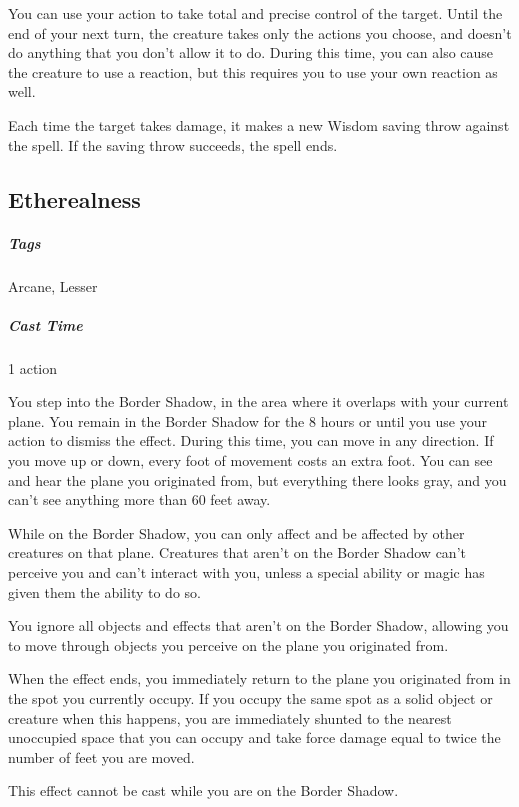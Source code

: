 You can use your action to take total and precise control of the target. Until the end of your next turn, the creature takes only the actions you choose, and doesn’t do anything that you don’t allow it to do. During this time, you can also cause the creature to use a reaction, but this requires you to use your own reaction as well.

Each time the target takes damage, it makes a new Wisdom saving throw against the spell. If the saving throw succeeds, the spell ends.

\subsection{Etherealness}
\subparagraph*{Tags} Arcane, Lesser
\subparagraph*{Cast Time} 1 action

You step into the Border Shadow, in the area where it overlaps with your current plane. You remain in the Border Shadow for the 8 hours or until you use your action to dismiss the effect. During this time, you can move in any direction. If you move up or down, every foot of movement costs an extra foot. You can see and hear the plane you originated from, but everything there looks gray, and you can’t see anything more than 60 feet away.

While on the  Border Shadow, you can only affect and be affected by other creatures on that plane. Creatures that aren’t on the Border Shadow can’t perceive you and can’t interact with you, unless a special ability or magic has given them the ability to do so.

You ignore all objects and effects that aren’t on the Border Shadow, allowing you to move through objects you perceive on the plane you originated from.

When the effect ends, you immediately return to the plane you originated from in the spot you currently occupy. If you occupy the same spot as a solid object or creature when this happens, you are immediately shunted to the nearest unoccupied space that you can occupy and take force damage equal to twice the number of feet you are moved.

This effect cannot be cast while you are on the Border Shadow.



